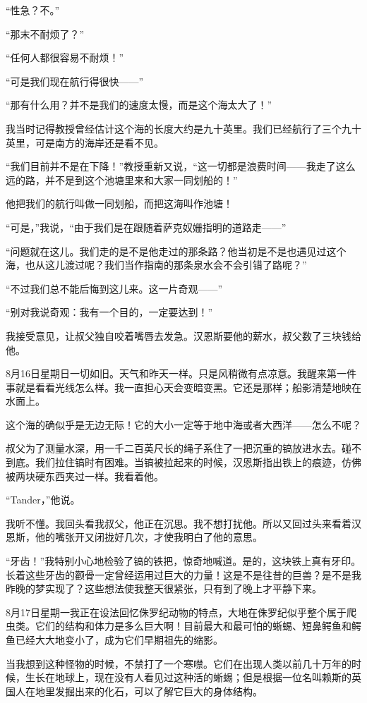 \documentclass[10pt]{book}
\begin{document}
“性急？不。”

“那末不耐烦了？”

“任何人都很容易不耐烦！”

“可是我们现在航行得很快——”

“那有什么用？并不是我们的速度太慢，而是这个海太大了！”

我当时记得教授曾经估计这个海的长度大约是九十英里。我们已经航行了三个九十英里，可是南方的海岸还是看不见。

“我们目前并不是在下降！”教授重新又说，“这一切都是浪费时间——我走了这么远的路，并不是到这个池塘里来和大家一同划船的！”

他把我们的航行叫做一同划船，而把这海叫作池塘！

“可是，”我说，“由于我们是在跟随着萨克奴姗指明的道路走——”

“问题就在这儿。我们走的是不是他走过的那条路？他当初是不是也遇见过这个海，也从这儿渡过呢？我们当作指南的那条泉水会不会引错了路呢？”

“不过我们总不能后悔到这儿来。这一片奇观——”

“别对我说奇观：我有一个目的，一定要达到！”

我接受意见，让叔父独自咬着嘴唇去发急。汉恩斯要他的薪水，叔父数了三块钱给他。

8月16日星期日一切如旧。天气和昨天一样。只是风稍微有点凉意。我醒来第一件事就是看看光线怎么样。我一直担心天会变暗变黑。它还是那样；船影清楚地映在水面上。

这个海的确似乎是无边无际！它的大小一定等于地中海或者大西洋——怎么不呢？

叔父为了测量水深，用一千二百英尺长的绳子系住了一把沉重的镐放进水去。碰不到底。我们拉住镐时有困难。当镐被拉起来的时候，汉恩斯指出铁上的痕迹，仿佛被两块硬东西夹过一样。我看着他。

“Tander，”他说。

我听不懂。我回头看我叔父，他正在沉思。我不想打扰他。所以又回过头来看着汉恩斯，他的嘴张开又闭拢好几次，才使我明白了他的意思。

“牙齿！”我特别小心地检验了镐的铁把，惊奇地喊道。是的，这块铁上真有牙印。长着这些牙齿的颧骨一定曾经运用过巨大的力量！这是不是往昔的巨兽？是不是我昨晚的梦实现了？这些想法使我整天很紧张，只有到了晚上才平静下来。

8月17日星期一我正在设法回忆侏罗纪动物的特点，大地在侏罗纪似乎整个属于爬虫类。它们的结构和体力是多么巨大啊！目前最大和最可怕的蜥蜴、短鼻鳄鱼和鳄鱼已经大大地变小了，成为它们早期祖先的缩影。

当我想到这种怪物的时候，不禁打了一个寒噤。它们在出现人类以前几十万年的时候，生长在地球上，现在没有人看见过这种活的蜥蜴；但是根据一位名叫赖斯的英国人在地里发掘出来的化石，可以了解它巨大的身体结构。
\end{document}
